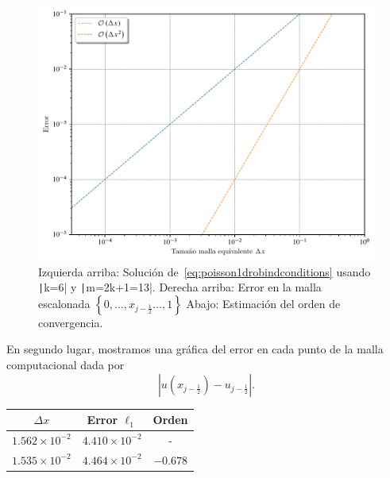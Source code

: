 \begin{problem}
\begin{figure}[ht!]
    \includegraphics[width=.3\paperwidth]{elliptic1Dconvergenceorder.pdf}
    \caption{Izquierda arriba: Solución de~\eqref{eq:poisson1drobindconditions}
        usando \texttt|k=6| y \texttt|m=2k+1=13|.
        Derecha arriba: Error en la malla escalonada
        \begin{math}
            \left\{
            0,
            \dotsc,
            x_{j-\frac{1}{2}}
            \dotsc,
            1
            \right\}
        \end{math}
        Abajo: Estimación del orden de convergencia.}
\end{figure}

En segundo lugar, mostramos una gráfica del error en cada punto de la malla computacional
dada por
\begin{equation*}
    \left|
    u\left(x_{j-\frac{1}{2}}\right)-
    u_{j-\frac{1}{2}}
    \right|.
\end{equation*}

\begin{table}[ht!]
    \centering
    \begin{tabular}{ccc}
        \toprule
        $\Delta x$            & Error $\ell_1$        & Orden    \\
        \midrule
        $1.562\times 10^{-2}$ & $4.410\times 10^{-2}$ & -        \\
        $1.535\times 10^{-2}$ & $4.464\times 10^{-2}$ & $-0.678$ \\
        \bottomrule
    \end{tabular}
    \label{table:errors}
\end{table}


\end{problem}
